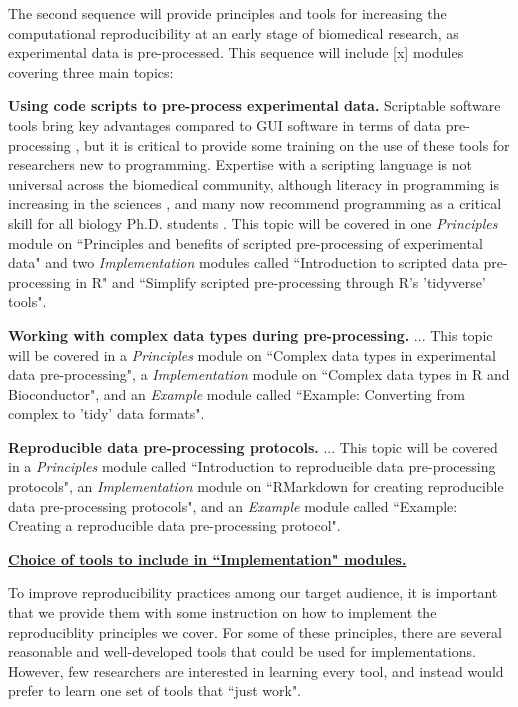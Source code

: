 \documentclass[pdftex,english,11pt,parskip=half]{scrartcl}
\begin{document}
The second sequence will provide principles and tools for increasing the
computational reproducibility at an early stage of biomedical research, as
experimental data is pre-processed. This sequence will include [x] modules
covering three main topics: 

\textbf{Using code scripts to pre-process experimental data.} Scriptable
software tools bring key advantages compared to GUI software in terms of data
pre-processing \cite{cetinkaya2017infrastructure, huber2015orchestrating,
preeyanon2014reproducible, piccolo2016tools}, but it is critical to provide some
training on the use of these tools for researchers new to programming. Expertise
with a scripting language is not universal across the biomedical community,
although literacy in programming is increasing in the sciences
\cite{ram2013git}, and many now recommend programming as a critical skill for
all biology Ph.D. students \cite{list2017ten}. This topic will be covered in one
\textit{Principles} module on ``Principles and benefits of scripted
pre-processing of experimental data" and two \textit{Implementation} modules
called ``Introduction to scripted data pre-processing in R" and ``Simplify
scripted pre-processing through R's 'tidyverse' tools".

\textbf{Working with complex data types during pre-processing.} ... This topic
will be covered in a \textit{Principles} module on ``Complex data types in
experimental data pre-processing", a \textit{Implementation} module on ``Complex
data types in R and Bioconductor", and an \textit{Example} module called
``Example: Converting from complex to 'tidy' data formats".

\textbf{Reproducible data pre-processing protocols.} ... This topic will be
covered in a \textit{Principles} module called ``Introduction to reproducible
data pre-processing protocols", an \textit{Implementation} module on ``RMarkdown
for creating reproducible data pre-processing protocols", and an
\textit{Example} module called ``Example: Creating a reproducible data
pre-processing protocol". 

\underline{\textbf{Choice of tools to include in ``Implementation" modules.}}

To improve reproducibility practices among our target audience, it is important
that we provide them with some instruction on how to implement the
reproduciblity principles we cover. For some of these principles, there are
several reasonable and well-developed tools that could be used for
implementations. However, few researchers are interested in learning every tool,
and instead would prefer to learn one set of tools that ``just work". 
\end{document}
